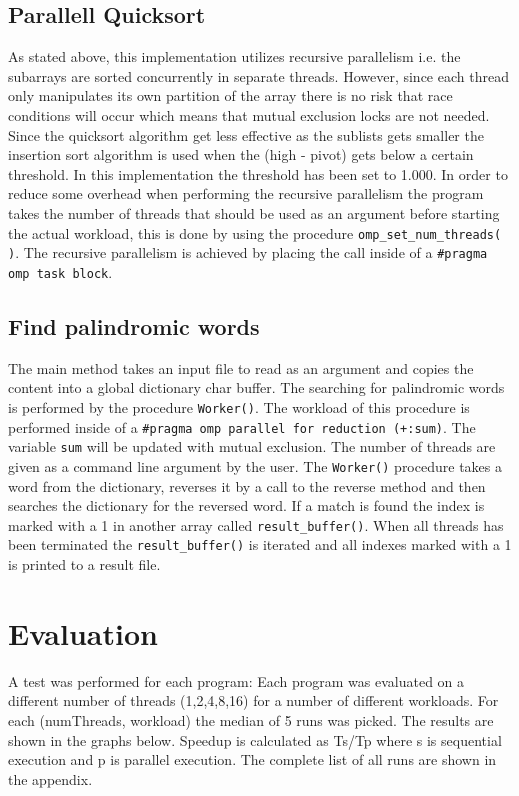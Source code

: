 \documentclass{article}
\begin{document}
\subsection{Parallell Quicksort}

As stated above, this implementation utilizes recursive parallelism i.e. the subarrays are sorted concurrently in separate threads. However, since each thread only manipulates its own partition of the array there is no risk that race conditions will occur which means that mutual exclusion locks are not needed.
Since the quicksort algorithm get less effective as the sublists gets smaller the insertion sort algorithm is used when the (high - pivot) gets below a certain threshold. In this implementation the threshold has been set to 1.000. 
In order to reduce some overhead when performing the recursive parallelism the program takes the number of threads that should be used as an argument  before starting the actual workload, this is done by using the procedure \texttt{omp\_set\_num\_threads( )}.
The recursive parallelism is achieved by placing the call inside of a \texttt{#pragma omp task block}. 

\subsection{ Find palindromic words}
The main method takes an input file to read as an argument and copies the content into a global dictionary char buffer. The searching for palindromic words is performed by the procedure \texttt{Worker()}. The workload of this procedure is performed inside of a \texttt{#pragma omp parallel for reduction (+:sum)}. The variable \texttt{sum} will be updated with mutual exclusion. The number of threads are given as a command line argument by the user. 
The \texttt{Worker()} procedure takes a word from the dictionary, reverses it by a call to the reverse method and then searches the dictionary for the reversed word. If a match is found the index is marked with a 1 in another array called  \texttt{result\_buffer()}. When all threads has been terminated the \texttt{result\_buffer()} is iterated and all indexes marked with a 1 is printed to a result file. 



\clearpage
\section{Evaluation}

A test was performed for each program: Each program was evaluated on a different number of threads (1,2,4,8,16) for a number of different workloads. For each (numThreads, workload) the median of 5 runs was picked. The results are shown in the graphs below. Speedup is calculated as Ts/Tp where s is sequential execution and p is parallel execution. The complete list of all runs are shown in the appendix.
\end{document}
